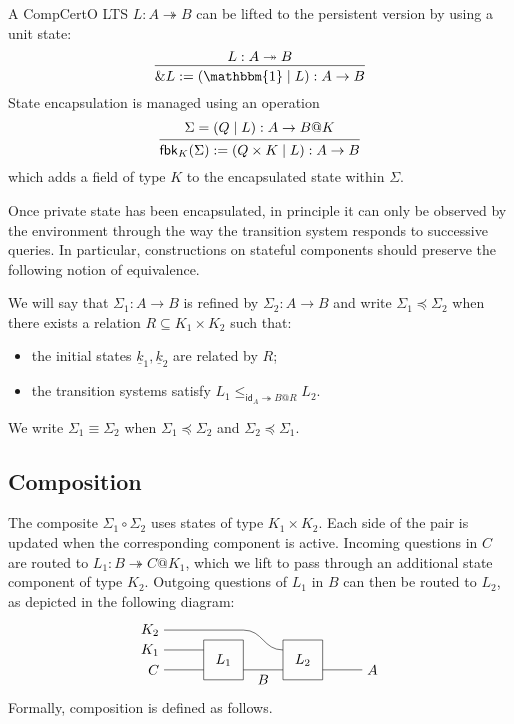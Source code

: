 \documentclass[acmsmall,screen,review,anonymous]{acmart}
\newcommand{\kw}[1]{\ensuremath{ \mathsf{#1} }}
\renewcommand{\preceq}{\preccurlyeq}
\newcommand{\intl}[1]{\underline{#1}}
\begin{document}
A CompCertO LTS $L : A \twoheadrightarrow B$
can be lifted to the persistent version
by using a unit state:
\[
  \begin{prooftree}
    \hypo{L : A \twoheadrightarrow B}
    \infer1{\&L := (\mathbbm{1} \mid L) : A \rightarrow B}
  \end{prooftree}
\]
State encapsulation is managed using an operation
\[
  \begin{prooftree}
    \hypo{\Sigma = (Q \mid L) : A \rightarrow B@K}
    \infer1{\mathsf{fbk}_K(\Sigma) := (Q \times K \mid L) : A \rightarrow B}
  \end{prooftree}
\]
which adds a field of type $K$ to the encapsulated state within $\Sigma$.

Once private state has been encapsulated,
in principle it can only be observed by the environment
through the way the transition system responds
to successive queries.
In particular,
constructions on stateful components
should preserve the following notion of equivalence.

\begin{definition} \label{def:ssim}
We will say that $\Sigma_1 : A \rightarrow B$
is refined by $\Sigma_2 : A \rightarrow B$
and write $\Sigma_1 \preceq \Sigma_2$
when there exists a relation $R \subseteq K_1 \times K_2$
such that:
\begin{itemize}
  \item the initial states $\intl{k}_1, \intl{k}_2$ are related by $R$;
  \item the transition systems satisfy
    $L_1 \le_{\kw{id}_A \twoheadrightarrow B@R} L_2$.
\end{itemize}
We write $\Sigma_1 \equiv \Sigma_2$ when
$\Sigma_1 \preceq \Sigma_2$ and
$\Sigma_2 \preceq \Sigma_1$.
\end{definition}


\subsection{Composition} %

The composite $\Sigma_1 \circ \Sigma_2$
uses states of type $K_1 \times K_2$.
Each side of the pair is updated
when the corresponding component is active.
Incoming questions in $C$ are routed to $L_1 : B \twoheadrightarrow C@K_1$,
which we lift to pass through an additional state component of type $K_2$.
Outgoing questions of $L_1$ in $B$ can then be routed to $L_2$,
as depicted in the following diagram:
\[
  \begin{tikzpicture}[yscale=0.5]
    \draw (0,2) node[left] {$K_2$} -- (2,2) .. controls +(0.5,0) and +(-0.5,0) .. (3,1);
    \draw (0,1) node[left] {$K_1$} -- (1,1);
    \draw (0,0) node[left] {$C$} -- (1,0);
    \draw (2,0) -- node[below] {$B$} (3,0);
    \draw (4,0) -- (5,0) node[right] {$A$};
    \draw (1,1.5) rectangle node {$L_1$} (2,-0.5);
    \draw (3,1.5) rectangle node {$L_2$} (4,-0.5);
  \end{tikzpicture}
\]
Formally,
composition is defined as follows.
\end{document}
